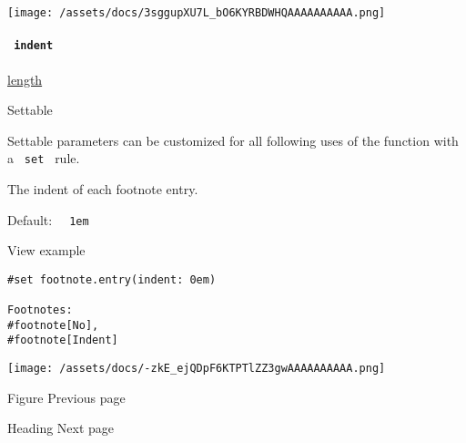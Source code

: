 \texttt{[image: /assets/docs/3sggupXU7L\_bO6KYRBDWHQAAAAAAAAAA.png]}

\paragraph{\texorpdfstring{\texttt{\ indent\ }}{ indent }}\label{definitions-entry-indent}

\href{/docs/reference/layout/length/}{length}

{{ Settable }}

\label{definitions-entry-indent-settable-tooltip}
Settable parameters can be customized for all following uses of the
function with a \texttt{\ set\ } rule.

The indent of each footnote entry.

Default: \texttt{\ }{\texttt{\ 1em\ }}\texttt{\ }


View example

\begin{verbatim}
#set footnote.entry(indent: 0em)

Footnotes:
#footnote[No],
#footnote[Indent]
\end{verbatim}

\texttt{[image: /assets/docs/-zkE\_ejQDpF6KTPTlZZ3gwAAAAAAAAAA.png]}

\href{/docs/reference/model/figure/}{\pandocbounded{}}

{ Figure } { Previous page }

\href{/docs/reference/model/heading/}{\pandocbounded{}}

{ Heading } { Next page }
